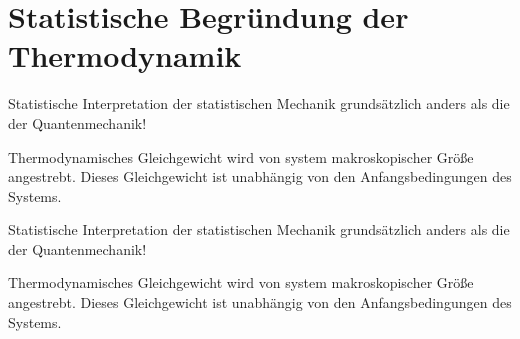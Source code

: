\documentclass[12pt]{article}
\begin{document}
\section{Statistische Begründung der Thermodynamik }

Statistische Interpretation der statistischen Mechanik grundsätzlich anders als die der Quantenmechanik!

Thermodynamisches Gleichgewicht wird von system makroskopischer Größe angestrebt. Dieses Gleichgewicht ist unabhängig von den Anfangsbedingungen des Systems.


Statistische Interpretation der statistischen Mechanik grundsätzlich anders als die der Quantenmechanik!

Thermodynamisches Gleichgewicht wird von system makroskopischer Größe angestrebt. Dieses Gleichgewicht ist unabhängig von den Anfangsbedingungen des Systems.
\end{document}

